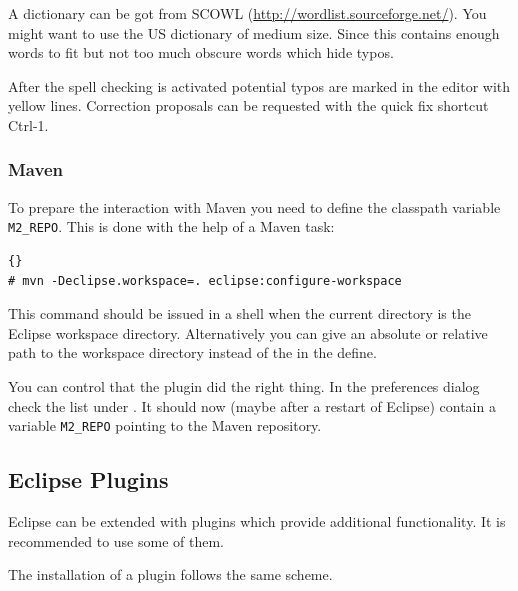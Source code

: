 A dictionary can be got from SCOWL
(\url{http://wordlist.sourceforge.net/}). You might want to use the US
dictionary of medium size. Since this contains enough words to fit but
not too much obscure words which hide typos.

After the spell checking is activated potential typos are marked in
the editor with yellow lines. Correction proposals can be requested
with the quick fix shortcut Ctrl-1.


\subsubsection{Maven}

To prepare the interaction with Maven you need to define the classpath
variable \texttt{M2\_REPO}. This is done with the help of a Maven
task:
\begin{lstlisting}{}
# mvn -Declipse.workspace=. eclipse:configure-workspace
\end{lstlisting}
This command should be issued in a shell when the current directory is
the Eclipse workspace directory. Alternatively you can give an
absolute or relative path to the workspace directory instead of the
 in the define.

You can control that the plugin did the right thing. In the
preferences dialog check the list under . It should now (maybe after a restart of
Eclipse) contain a variable \texttt{M2\_REPO} pointing to the Maven
repository.


\subsection{Eclipse Plugins}\label{sec:eclipse.plugins}

Eclipse can be extended with plugins which provide additional
functionality. It is recommended to use some of them.

The installation of a plugin follows the same scheme.

